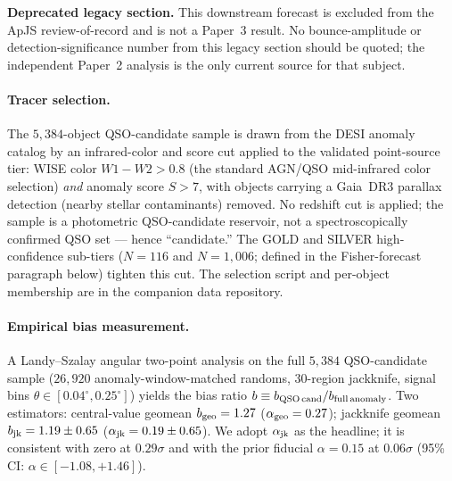 \documentclass[aps,prd,twocolumn,superscriptaddress,showpacs,preprintnumbers,nofootinbib,longbibliography,floatfix]{revtex4-2}
\begin{document}
\textbf{Deprecated legacy section.} This downstream forecast is excluded from the ApJS review-of-record and is not a Paper~3 result. No bounce-amplitude or detection-significance number from this legacy section should be quoted; the independent Paper~2 analysis is the only current source for that subject.

\paragraph{Tracer selection.}
The $5{,}384$-object QSO-candidate sample is drawn from the DESI anomaly catalog by an infrared-color and score cut applied to the validated point-source tier: WISE color $W1\!-\!W2 > 0.8$ (the standard AGN/QSO mid-infrared color selection) \emph{and} anomaly score $S > 7$, with objects carrying a Gaia~DR3 parallax detection (nearby stellar contaminants) removed. No redshift cut is applied; the sample is a photometric QSO-candidate reservoir, not a spectroscopically confirmed QSO set --- hence ``candidate.'' The GOLD and SILVER high-confidence sub-tiers ($N = 116$ and $N = 1{,}006$; defined in the Fisher-forecast paragraph below) tighten this cut. The selection script and per-object membership are in the companion data repository.

\paragraph{Empirical bias measurement.}
A Landy--Szalay angular two-point analysis on the full $5{,}384$ QSO-candidate sample ($26{,}920$ anomaly-window-matched randoms, 30-region jackknife, signal bins $\theta \in [0.04^\circ, 0.25^\circ]$) yields the bias ratio $b \equiv b_{\rm QSO\,cand}/b_{\rm full\,anomaly}$. Two estimators: central-value geomean $b_{\rm geo} = 1.27$ ($\alpha_{\rm geo} = 0.27$); jackknife geomean $b_{\rm jk} = 1.19 \pm 0.65$ ($\alpha_{\rm jk} = 0.19 \pm 0.65$). We adopt $\alpha_{\rm jk}$ as the headline; it is consistent with zero at $0.29\sigma$ and with the prior fiducial $\alpha = 0.15$ at $0.06\sigma$ (95\% CI: $\alpha \in [-1.08, +1.46]$).
\end{document}
